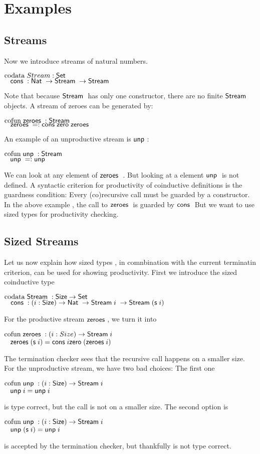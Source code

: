 \section{Examples}

\subsection{Streams}
Now we introduce streams of natural numbers.
\begin{bsp}
$\mathrm{codata}\; Stream : \mathsf{Set} $ \\
$\hspace*{3mm} \mathsf{cons}\; : \mathsf{Nat}\; \rightarrow \mathsf{Stream}\; \rightarrow \mathsf{Stream}\; $
\end{bsp}
Note that because $\mathsf{Stream}\;$ has only one constructor, there are no finite $\mathsf{Stream}\;$ objects.
A stream of zeroes can be generated by:
\begin{bsp}
$\mathrm{cofun}\; \mathsf{zeroes}\;: \mathsf{Stream}\; $ \\
$\hspace*{3mm} \mathsf{zeroes}\; = : \mathsf{cons}\; \mathsf{zero}\; \mathsf{zeroes}\;$
\end{bsp}

An example of an unproductive stream is $\mathsf{unp}\;$:
\begin{bsp}
$\mathrm{cofun}\; \mathsf{unp}\; : \mathsf{Stream}\; $ \\
$\hspace*{3mm} \mathsf{unp}\; = : \mathsf{unp}\;$
\end{bsp}
We can look at any element of $\mathsf{zeroes}\;$ .
But looking at a element $\mathsf{unp}\;$ is not defined. 
A syntactic criterion for productivity of coinductive definitions is the guardness condition:
Every (co)recursive call must be guarded by a constructor.
In the above example , the call to $\mathsf{zeroes}\;$ is guarded by $\mathsf{cons}\;$
But we want to use sized types for productivity checking.
\subsection{Sized Streams}
Let us now explain how sized types , in comnbination with the current terminatin criterion, can be used for showing productivity.
First we introduce the sized coinductive type 
\begin{bsp}
$\mathrm{codata}\; \mathsf{Stream}\; : \mathsf{Size} \rightarrow \mathsf{Set} $ \\
$\hspace*{3mm} \mathsf{cons}\; : ( i : \mathsf{Size} ) \rightarrow{\mathsf{Nat}\;\rightarrow\mathsf{Stream}\;i \; \rightarrow\mathsf{Stream}\;(\mathsf{s}\;i) } $
\end{bsp}
For the productive stream $\mathsf{zeroes}\;$, we turn it into
\begin{bsp}
$\mathrm{cofun}\; \mathsf{zeroes}\;: ( i : Size ) \rightarrow{\mathsf{Stream}\;i} $ \\
$\hspace*{3mm} \mathsf{zeroes}\; (\mathsf{s}\; i) = \mathsf{cons}\; i \mathsf{zero}\; (\mathsf{zeroes}\; i)$\\
\end{bsp}
The termination checker sees that the recursive call happens on a smaller size.
For the unproductive stream, we have two bad choices:
The first one
\begin{bsp}
$\mathrm{cofun}\; \mathsf{unp}\; : ( i : \mathsf{Size} ) \rightarrow{\mathsf{Stream}\;i}$ \\
$\hspace*{3mm} \mathsf{unp}\; i =  \mathsf{unp}\; i$
\end{bsp}
is type correct, but the call is not on a smaller size.
The second option is
\begin{bsp}
$\mathrm{cofun}\; \mathsf{unp}\; : ( i : \mathsf{Size} ) \rightarrow{\mathsf{Stream}\;i}$ \\
$\hspace*{3mm} \mathsf{unp}\; (\mathsf{s}\; i) = \mathsf{unp}\; i $
\end{bsp}
is accepted by the termination checker, but thankfully is not type correct.
